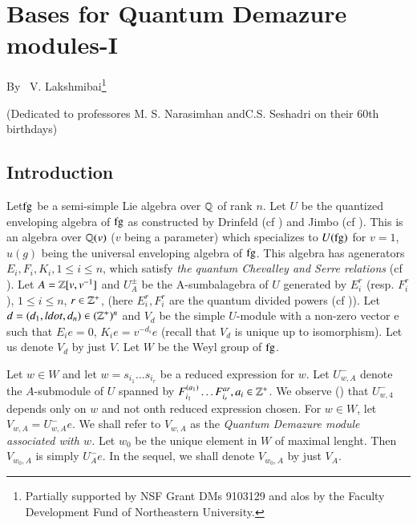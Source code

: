 \chapter{Bases for Quantum Demazure modules-I}\label{chap9}

\begin{center}
By~ V. Lakshmibai\footnote{Partially supported by NSF Grant DMs 9103129 and alos by the Faculty Development Fund of Northeastern University.}

\medskip
(Dedicated to professores M. S. Narasimhan and\break C.S. Seshadri on their 60th birthdays)
\end{center}


\section{Introduction}\label{chap9-sec-1}
Let\pageoriginale $\operatorname{fg}$ be a semi-simple Lie algebra over $\mathbb{Q}$ of rank $n$. Let $U$ be the quantized enveloping algebra of $\operatorname{fg}$ as constructed by Drinfeld (cf \cite{chap9-keyD}) and Jimbo (cf \cite{chap9-keyJ}). This is an algebra over $\mathbb{Q}(v)$ ($v$ being a parameter)  which specializes to $U(\operatorname{fg})$ for $v=1$, $u(g)$ being the universal enveloping algebra of $\operatorname{fg}$. This algebra has agenerators $E_{i}, F_{i}, K_{i}, 1\leq i \leq n$, which satisfy \textit{the quantum Chevalley and Serre relations} (cf \cite{chap9-keyL1}). Let $A= \mathbb{Z}[v, v^{-1}] $ and $U_{A}^{\pm}$ be the A-sumbalagebra of $U$ generated by $E_{i}^{r}$ (resp. $F_{i}^{r}$), $1\leq i \leq n$, $r \in \mathbb{Z}^{+}$, (here $E_{i}^{r}, F_{i}^{r}$ are the quantum divided powers (cf \cite{chap9-keyJ})). Let $d=(d_{1}, ldot, d_{n}) \in (\mathbb{Z}^{+})^{n}$ and $V_{d}$ be the simple $U$-module with a non-zero vector e such that $E_{i}e=0$, $K_{i}e =v^{-d_{i}}e$ (recall that $V_{d}$ is unique up to isomorphism). Let us denote $V_{d}$ by just $V$. Let $W$ be the Weyl group of $\operatorname{fg}$.

Let $w \in W$ and let $w=s_{i_{1}}\ldots s_{i_{r}}$ be a reduced expression for $w$. Let $U_{w,A}^{-}$ denote the $A$-submodule of $U$ spanned by $F_{i_{1}}^{(a_{1})}\ldots F_{i_{r}}^{ar}, a_{i}\in \mathbb{Z}^{+}$. We observe (\cite{chap9-keyL4}) that $U_{w,4}^{-}$ depends only on $w$ and not onth reduced expression chosen. For $w\in W$, let $V_{w,A}=U_{w,A}^{-}e$. We shall refer to $V_{w, A}$ as the \textit{Quantum Demazure module associated with $w$.} Let $w_{0}$ be the unique element in $W$ of maximal lenght. Then $V_{w_{0},A}$ is simply $U_{A}^{-}e$. In the sequel, we shall denote $V_{w_{0}, A}$ by just $V_{A}$.

